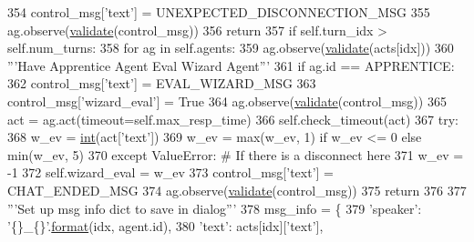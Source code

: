 \begin{DoxyCode}
354                         control\_msg[\textcolor{stringliteral}{'text'}] = UNEXPECTED\_DISCONNECTION\_MSG
355                         ag.observe(\hyperlink{namespaceparlai_1_1core_1_1worlds_afc3fad603b7bce41dbdc9cdc04a9c794}{validate}(control\_msg))
356                         \textcolor{keywordflow}{return}
357                 \textcolor{keywordflow}{if} self.turn\_idx > self.num\_turns:
358                     \textcolor{keywordflow}{for} ag \textcolor{keywordflow}{in} self.agents:
359                         ag.observe(\hyperlink{namespaceparlai_1_1core_1_1worlds_afc3fad603b7bce41dbdc9cdc04a9c794}{validate}(acts[idx]))
360                         \textcolor{stringliteral}{'''Have Apprentice Agent Eval Wizard Agent'''}
361                         \textcolor{keywordflow}{if} ag.id == APPRENTICE:
362                             control\_msg[\textcolor{stringliteral}{'text'}] = EVAL\_WIZARD\_MSG
363                             control\_msg[\textcolor{stringliteral}{'wizard\_eval'}] = \textcolor{keyword}{True}
364                             ag.observe(\hyperlink{namespaceparlai_1_1core_1_1worlds_afc3fad603b7bce41dbdc9cdc04a9c794}{validate}(control\_msg))
365                             act = ag.act(timeout=self.max\_resp\_time)
366                             self.check\_timeout(act)
367                             \textcolor{keywordflow}{try}:
368                                 w\_ev = \hyperlink{namespacelanguage__model_1_1eval__ppl_a7d12ee00479673c5c8d1f6d01faa272a}{int}(act[\textcolor{stringliteral}{'text'}])
369                                 w\_ev = max(w\_ev, 1) \textcolor{keywordflow}{if} w\_ev <= 0 \textcolor{keywordflow}{else} min(w\_ev, 5)
370                             \textcolor{keywordflow}{except} ValueError:  \textcolor{comment}{# If there is a disconnect here}
371                                 w\_ev = -1
372                             self.wizard\_eval = w\_ev
373                         control\_msg[\textcolor{stringliteral}{'text'}] = CHAT\_ENDED\_MSG
374                         ag.observe(\hyperlink{namespaceparlai_1_1core_1_1worlds_afc3fad603b7bce41dbdc9cdc04a9c794}{validate}(control\_msg))
375                 \textcolor{keywordflow}{return}
376 
377             \textcolor{stringliteral}{'''Set up msg info dict to save in dialog'''}
378             msg\_info = \{
379                 \textcolor{stringliteral}{'speaker'}: \textcolor{stringliteral}{'\{\}\_\{\}'}.\hyperlink{namespaceparlai_1_1chat__service_1_1services_1_1messenger_1_1shared__utils_a32e2e2022b824fbaf80c747160b52a76}{format}(idx, agent.id),
380                 \textcolor{stringliteral}{'text'}: acts[idx][\textcolor{stringliteral}{'text'}],

\end{DoxyCode}
